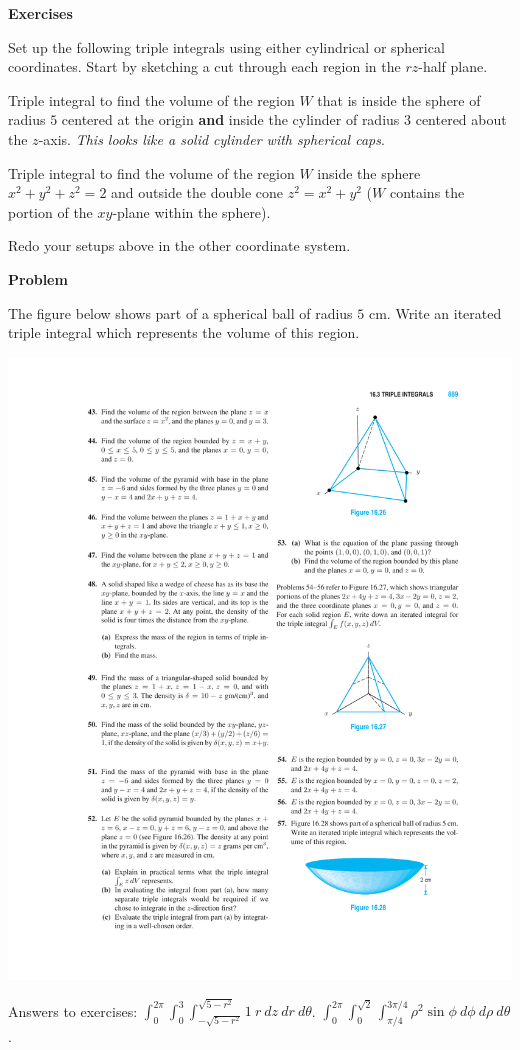 \documentclass[12pt,letterpaper,noanswers]{exam}
\begin{document}
\noindent\textbf{Exercises}

Set up the following triple integrals using either cylindrical or spherical coordinates.  Start by sketching a cut through each region in the $rz$-half plane.
\begin{parts}
\item Triple integral to find the volume of the region $W$ that is inside the sphere of radius $5$ centered at the origin \textbf{and} inside the cylinder of radius $3$ centered about the $z$-axis.  \emph{This looks like a solid cylinder with spherical caps}.
\item Triple integral to find the volume of the region $W$ inside the sphere $x^2+y^2+z^2 = 2$ and outside the double cone $z^2=x^2+y^2$ ($W$ contains the portion of the $xy$-plane within the sphere).
\item Redo your setups above in the other coordinate system.
\end{parts}

\vfill


\eject


\noindent\textbf{Problem}


The figure below shows part of a spherical ball of radius $5$ cm.  Write an iterated triple integral which represents the volume of this region.

\includegraphics{img/W05p2.pdf}


\vfill

Answers to exercises: $\int_0^{2\pi}\int_0^3\int_{-\sqrt{5-r^2}}^{\sqrt{5-r^2}}1\ r\ dz\ dr\ d\theta$.  $\int_0^{2\pi}\int_0^{\sqrt{2}}\int_{\pi/4}^{3\pi/4} \rho^2\sin\phi\ d\phi\ d\rho\ d\theta$.
\end{document}
